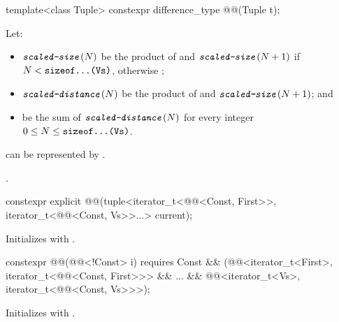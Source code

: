\begin{itemdecl}
template<class Tuple>
  constexpr difference_type @@(Tuple t);
\end{itemdecl}

\begin{itemdescr}
\pnum
Let:
\begin{itemize}
\item
$\texttt{\textit{scaled-size}}(N)$ be the product of
 and
$\texttt{\textit{scaled-size}}(N+1)$
if $N < \texttt{sizeof...(Vs)}$, otherwise ;
\item
$\texttt{\textit{scaled-distance}}(N)$ be the product of
 and $\texttt{\textit{scaled-size}}(N+1)$; and
\item
{} be the sum of $\texttt{\textit{scaled-distance}}(N)$
for every integer $0 \le N \le \texttt{sizeof...(Vs)}$.
\end{itemize}

\pnum
\expects
{} can be represented by .

\pnum
\returns
{}.
\end{itemdescr}

\begin{itemdecl}
constexpr explicit @@(tuple<iterator_t<@@<Const, First>>,
  iterator_t<@@<Const, Vs>>...> current);
\end{itemdecl}

\begin{itemdescr}
\pnum
\effects
Initializes  with .
\end{itemdescr}

\begin{itemdecl}
constexpr @@(@@<!Const> i) requires Const &&
  (@@<iterator_t<First>, iterator_t<@@<Const, First>>> &&
    ... && @@<iterator_t<Vs>, iterator_t<@@<Const, Vs>>>);
\end{itemdecl}

\begin{itemdescr}
\pnum
\effects
Initializes  with .
\end{itemdescr}

